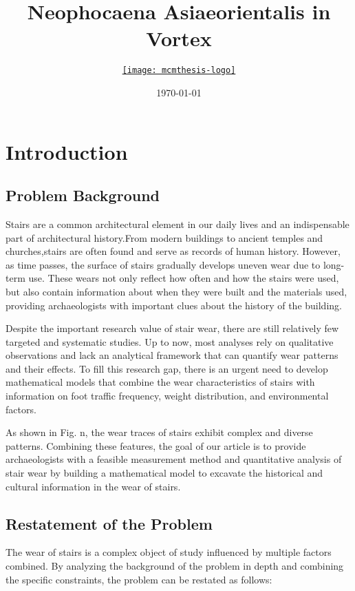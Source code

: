 \documentclass{mcmthesis}
\title{Neophocaena Asiaeorientalis in Vortex}
\author{\small \href{https://www.latexstudio.net/}
  {\texttt{[image: mcmthesis-logo]}}}
\date{\today}
\let\oldtableofcontents\tableofcontents
\renewcommand{\tableofcontents}{%
          \begingroup
          \setstretch{0.1} %
          \oldtableofcontents
          \endgroup
        }
\begin{document}
\begin{abstract}%
    \par       
\begin{keywords}%
               
\end{keywords}
\end{abstract}   

\maketitle
\newpage
\pagestyle{main}
\setcounter{page}{2} %
\tableofcontents

\newpage
\section{Introduction}
\subsection{Problem Background}
Stairs are a common architectural element in our daily lives and an indispensable part of architectural history.From modern buildings to ancient temples and churches,stairs are often found and serve as records of human history. However, as time passes, the surface of stairs gradually develops uneven wear due to long-term use. These wears not only reflect how often and how the stairs were used, but also contain information about when they were built and the materials used, providing archaeologists with important clues about the history of the building.

Despite the important research value of stair wear, there are still relatively few targeted and systematic studies. Up to now, most analyses rely on qualitative observations and lack an analytical framework that can quantify wear patterns and their effects. To fill this research gap, there is an urgent need to develop mathematical models that combine the wear characteristics of stairs with information on foot traffic frequency, weight distribution, and environmental factors.

As shown in Fig. n, the wear traces of stairs exhibit complex and diverse patterns. Combining these features, the goal of our article is to provide archaeologists with a feasible measurement method and quantitative analysis of stair wear by building a mathematical model to excavate the historical and cultural information in the wear of stairs.
\subsection{Restatement of the Problem}
The wear of stairs is a complex object of study influenced by multiple factors combined. By analyzing the background of the problem in depth and combining the specific constraints, the problem can be restated as follows:
\end{document}
